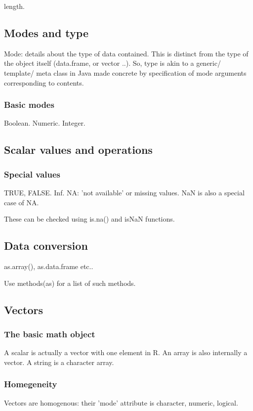 \documentclass[oneside, article]{memoir}
\begin{document}
length.

\subsection{Modes and type}
Mode: details about the type of data contained. This is distinct from the type of the object itself (data.frame, or vector ..). So, type is akin to a generic/ template/ meta class in Java made concrete by specification of mode arguments corresponding to contents.

\subsubsection{Basic modes}
Boolean. Numeric. Integer.

\subsection{Scalar values and operations}
\subsubsection{Special values}
TRUE, FALSE. Inf. NA: 'not available' or missing values. NaN is also a special case of NA.

These can be checked using is.na() and isNaN functions.

\subsection{Data conversion}
as.array(), as.data.frame etc..

Use methods(as) for a list of such methods.

\subsection{Vectors}
\subsubsection{The basic math object}
A scalar is actually a vector with one element in R. An array is also internally a vector. A string is a character array.

\subsubsection{Homegeneity}
Vectors are homogenous: their 'mode' attribute is character, numeric, logical.
\end{document}
